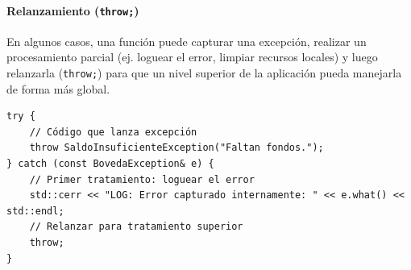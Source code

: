 \documentclass{article}
\newcommand{\inlinecode}[1]{\texttt{#1}}
\begin{document}
\paragraph*{\textbf{Relanzamiento (\inlinecode{throw;})}}
En algunos casos, una funci\'on puede capturar una excepci\'on, realizar un procesamiento parcial (ej. loguear el error, limpiar recursos locales) y luego relanzarla (\inlinecode{throw;}) para que un nivel superior de la aplicaci\'on pueda manejarla de forma m\'as global.
\begin{lstlisting}
try {
    // Código que lanza excepción
    throw SaldoInsuficienteException("Faltan fondos.");
} catch (const BovedaException& e) {
    // Primer tratamiento: loguear el error
    std::cerr << "LOG: Error capturado internamente: " << e.what() << std::endl;
    // Relanzar para tratamiento superior
    throw;
}
\end{lstlisting}
\end{document}
